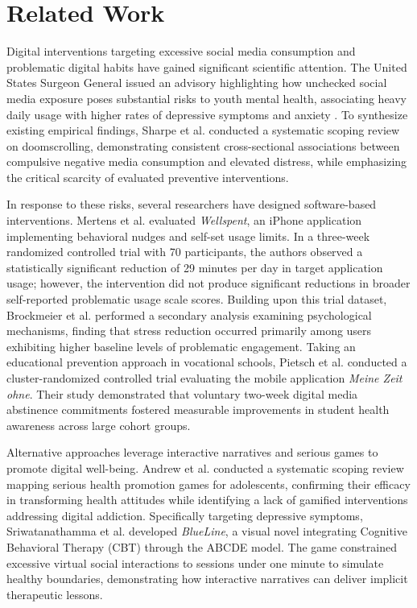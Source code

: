 \documentclass[conference]{IEEEtran}
\begin{document}
\section{Related Work}
\label{p1-sec:related_work}

Digital interventions targeting excessive social media consumption and problematic digital habits have gained significant scientific attention.
The United States Surgeon General issued an advisory highlighting how unchecked social media exposure poses substantial risks to youth mental health, associating heavy daily usage with higher rates of depressive symptoms and anxiety \cite{surgeon2023}.
To synthesize existing empirical findings, Sharpe et al. \cite{sharpe2026} conducted a systematic scoping review on doomscrolling, demonstrating consistent cross-sectional associations between compulsive negative media consumption and elevated distress, while emphasizing the critical scarcity of evaluated preventive interventions.

In response to these risks, several researchers have designed software-based interventions.
Mertens et al. \cite{mertens2026} evaluated \textit{Wellspent}, an iPhone application implementing behavioral nudges and self-set usage limits.
In a three-week randomized controlled trial with 70 participants, the authors observed a statistically significant reduction of 29 minutes per day in target application usage; however, the intervention did not produce significant reductions in broader self-reported problematic usage scale scores.
Building upon this trial dataset, Brockmeier et al. \cite{brockmeier2025} performed a secondary analysis examining psychological mechanisms, finding that stress reduction occurred primarily among users exhibiting higher baseline levels of problematic engagement.
Taking an educational prevention approach in vocational schools, Pietsch et al. \cite{pietsch2023} conducted a cluster-randomized controlled trial evaluating the mobile application \textit{Meine Zeit ohne}.
Their study demonstrated that voluntary two-week digital media abstinence commitments fostered measurable improvements in student health awareness across large cohort groups.

Alternative approaches leverage interactive narratives and serious games to promote digital well-being.
Andrew et al. \cite{andrew2023} conducted a systematic scoping review mapping serious health promotion games for adolescents, confirming their efficacy in transforming health attitudes while identifying a lack of gamified interventions addressing digital addiction.
Specifically targeting depressive symptoms, Sriwatanathamma et al. \cite{sriwatanathamma2023} developed \textit{BlueLine}, a visual novel integrating Cognitive Behavioral Therapy (CBT) through the ABCDE model.
The game constrained excessive virtual social interactions to sessions under one minute to simulate healthy boundaries, demonstrating how interactive narratives can deliver implicit therapeutic lessons.
\end{document}
